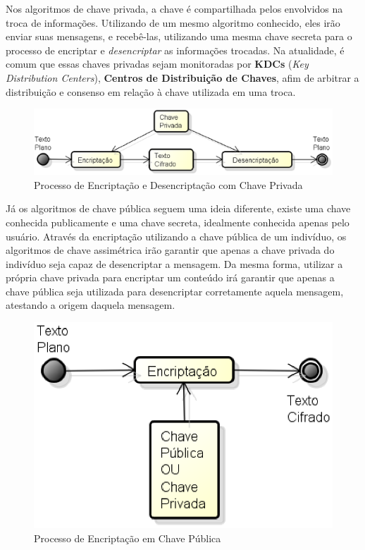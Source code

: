 	Nos algoritmos de chave privada, a chave é compartilhada pelos envolvidos na troca de informações. Utilizando de um mesmo algoritmo conhecido, eles irão enviar suas mensagens, e recebê-las, utilizando uma mesma chave secreta para o processo de encriptar e \textit{desencriptar} as informações trocadas. Na atualidade, é comum que essas chaves privadas sejam monitoradas por \textbf{KDCs} (\textit{Key Distribution Centers}), \textbf{Centros de Distribuição de Chaves}, afim de arbitrar a distribuição e consenso em relação à chave utilizada em uma troca.

	\begin{figure}[h]
		\centering
		\label{img02}
		\caption{Processo de Encriptação e Desencriptação com Chave Privada}
		\includegraphics[keepaspectratio=true,scale=0.5]{figuras/img01.eps}
	\end{figure}

	Já os algoritmos de chave pública seguem uma ideia diferente, existe uma chave conhecida publicamente e uma chave secreta, idealmente conhecida apenas pelo usuário. Através da encriptação utilizando a chave pública de um indivíduo, os algoritmos de chave assimétrica irão garantir que apenas a chave privada do indivíduo seja capaz de desencriptar a mensagem. Da mesma forma, utilizar a própria chave privada para encriptar um conteúdo irá garantir que apenas a chave pública seja utilizada para desencriptar corretamente aquela mensagem, atestando a origem daquela mensagem.

	\begin{figure}[h]
		\centering
		\label{img03}
		\caption{Processo de Encriptação em Chave Pública}
		\includegraphics[keepaspectratio=true,scale=0.5]{figuras/encript.eps}
	\end{figure}
	
